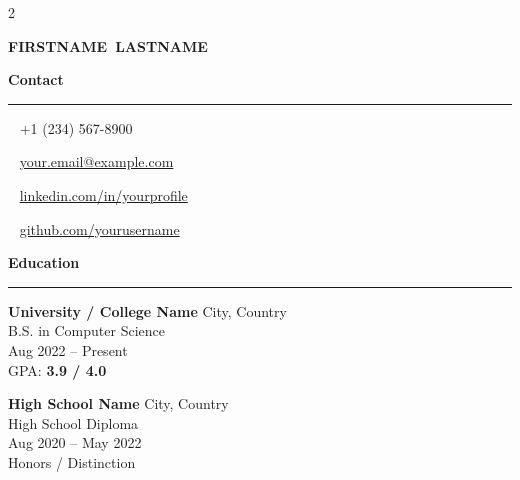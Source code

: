 \documentclass[10pt, a4paper]{article}
\newcommand{\leftsection}[1]{%
  \vspace{8pt}%
  {\color{accent}\large\bfseries #1}\\[-2pt]%
  {\color{accent}\rule{\linewidth}{1pt}}\par\vspace{4pt}%
}
\newcommand{\contactrow}[2]{%
  {\color{accent} #1}~{\footnotesize\color{mwhite} #2}\par\vspace{3pt}%
}
\begin{document}
\pagestyle{empty}
\color{bodytext}

\setlength{\columnsep}{0pt}

\begin{paracol}{2}

\begin{leftcolumn}
\color{mwhite}
\hspace{8pt}\begin{minipage}[t]{\dimexpr\linewidth-16pt}

  \vspace{16pt}
  {\fontsize{17}{21}\selectfont\bfseries\color{mwhite} FIRSTNAME~{\color{accent}LASTNAME}}\\[4pt]

  \vspace{-10pt}

  \leftsection{Contact}
  \contactrow{}{+1 (234) 567-8900}
  \contactrow{}{\href{mailto:your.email@example.com}{your.email@example.com}}
  \contactrow{}{\href{https://linkedin.com/in/yourprofile}{linkedin.com/in/yourprofile}}
  \contactrow{}{\href{https://github.com/yourusername}{github.com/yourusername}}

  \vspace{10pt}

  \leftsection{Education}

  {\small\bfseries\color{mwhite} University / College Name}\hfill{\footnotesize\color{accentlight} City, Country}\\
  {\footnotesize\color{accentlight} B.S. in Computer Science}\\
  {\footnotesize\color{accentlight} Aug 2022 -- Present}\\
  {\footnotesize\color{accent} GPA: \textbf{3.9 / 4.0}}

  \vspace{8pt}

  {\small\bfseries\color{mwhite} High School Name}\hfill{\footnotesize\color{accentlight} City, Country}\\
  {\footnotesize\color{accentlight} High School Diploma}\\
  {\footnotesize\color{accentlight} Aug 2020 -- May 2022}\\
  {\footnotesize\color{accent} Honors / Distinction}


\end{minipage}
\end{leftcolumn}
\end{paracol}
\end{document}
